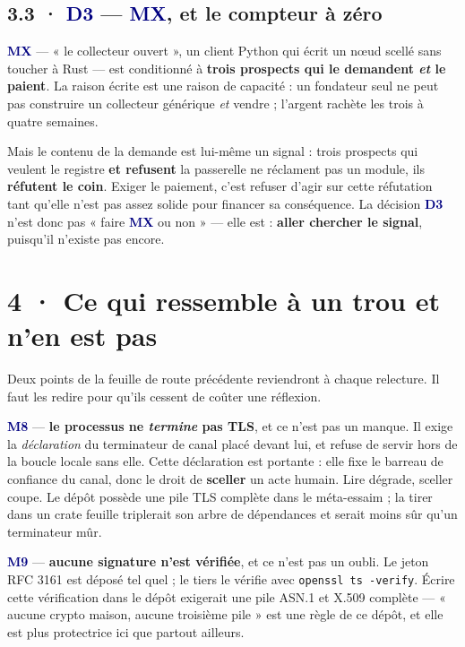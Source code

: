 \documentclass[10pt]{article}
\newcommand{\code}[1]{\texttt{\small #1}}
\newcommand{\mm}[1]{\textbf{\textcolor{navy}{#1}}}
\begin{document}
\subsection{3.3 · \mm{D3} --- \mm{MX}, et le compteur à zéro}

\mm{MX} --- « le collecteur ouvert », un client Python qui écrit un nœud scellé sans toucher à Rust
--- est conditionné à \textbf{trois prospects qui le demandent \emph{et} le paient}. La raison
écrite est une raison de capacité : un fondateur seul ne peut pas construire un collecteur générique
\emph{et} vendre ; l'argent rachète les trois à quatre semaines.

Mais le contenu de la demande est lui-même un signal : trois prospects qui veulent le registre
\textbf{et refusent} la passerelle ne réclament pas un module, ils \textbf{réfutent le coin}.
Exiger le paiement, c'est refuser d'agir sur cette réfutation tant qu'elle n'est pas assez solide
pour financer sa conséquence. La décision \mm{D3} n'est donc pas « faire \mm{MX} ou non » ---
elle est : \textbf{aller chercher le signal}, puisqu'il n'existe pas encore.

\section{4 · Ce qui ressemble à un trou et n'en est pas}

Deux points de la feuille de route précédente reviendront à chaque relecture. Il faut les redire
pour qu'ils cessent de coûter une réflexion.

\mm{M8} --- \textbf{le processus ne \emph{termine} pas TLS}, et ce n'est pas un manque. Il exige la
\emph{déclaration} du terminateur de canal placé devant lui, et refuse de servir hors de la boucle
locale sans elle. Cette déclaration est portante : elle fixe le barreau de confiance du canal, donc
le droit de \textbf{sceller} un acte humain. Lire dégrade, sceller coupe. Le dépôt possède une pile
TLS complète dans le méta-essaim ; la tirer dans un crate feuille triplerait son arbre de
dépendances et serait moins sûr qu'un terminateur mûr.

\mm{M9} --- \textbf{aucune signature n'est vérifiée}, et ce n'est pas un oubli. Le jeton RFC 3161
est déposé tel quel ; le tiers le vérifie avec \code{openssl ts -verify}. Écrire cette vérification
dans le dépôt exigerait une pile ASN.1 et X.509 complète --- « aucune crypto maison, aucune
troisième pile » est une règle de ce dépôt, et elle est plus protectrice ici que partout ailleurs.
\end{document}
